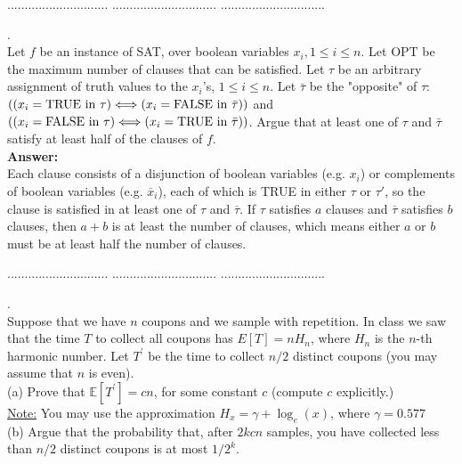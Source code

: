 \documentclass[a4paper,11pt]{article}
\begin{document}
\pagebreak
{} $.............................$
 $..............................$
          $..............................$\\

\bigskip

.\\
Let $f$ be an instance of SAT, over boolean variables $x_i, 1 \leq i \leq n$. Let OPT be the maximum number of clauses that can be satisfied. 
Let $\tau$ be an arbitrary assignment of truth values to the $x_i$'s, $1 \leq i \leq n$. 
Let $\bar{\tau}$ be the "opposite" of $\tau$: 
$((x_i=\mbox{TRUE in $\tau$}) \Longleftrightarrow (x_i=\mbox{FALSE in $ \bar{\tau}$}))$
and $((x_i=\mbox{FALSE in $\tau$}) \Longleftrightarrow (x_i=\mbox{TRUE in $ \bar{\tau}$}))$.
Argue that at least one of $\tau$ and $\bar{\tau}$ satisfy at least half of the clauses of $f$. \\

\noindent 
{\bf Answer:} \\
Each clause consists of a disjunction of boolean variables (e.g. $x_i$) or complements of boolean variables (e.g. $\overline{x}_i$), each of which is TRUE in either $\tau$ or $\tau'$, so the clause is satisfied in at least one of $\tau$ and $\overline{\tau}$. If $\tau$ satisfies $a$ clauses and $\overline{\tau}$ satisfies $b$ clauses, then $a + b$ is at least the number of clauses, which means either $a$ or $b$ must be at least half the number of clauses.


\pagebreak
{} $.............................$
 $..............................$
          $..............................$\\

\bigskip

.\\
Suppose that we have $n$ coupons and we sample with repetition. 
In class we saw that the time $T$ to collect all coupons has $E[T] = n H_n$, where $H_n$ is the $n$-th harmonic number. 
Let $T^\prime$  be the time to collect $n/2$ distinct coupons (you may assume that $n$ is even). \\
(a) Prove that $\mathbb{E}[T^\prime ] = c n$, for some constant $c$ (compute $c$ explicitly.)\\
 \underline{Note:} You may use the approximation $H_x = \gamma + \log_e (x)$, where $\gamma =0.577$\\
(b) Argue that the probability that, after $2kcn$ samples, you have collected less than $n/2$ distinct coupons is 
at most $1/2^k$. \\
\end{document}
